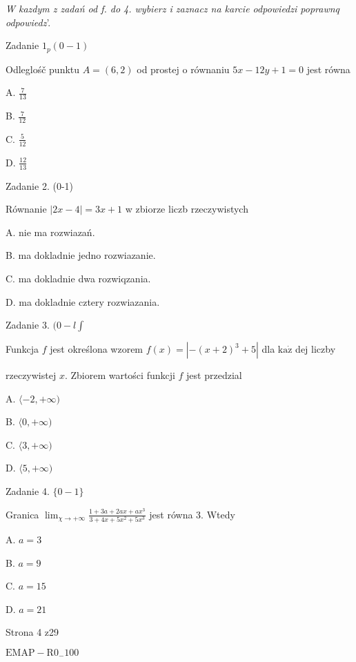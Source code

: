 \documentclass[a4paper,12pt]{article}
\begin{document}
{\it W kazdym z zadań od f. do 4. wybierz i zaznacz na karcie odpowiedzi poprawnq odpowiedz}'.

Zadanie $1_{p}(0-1)$

Odleglośč punktu $A=(6,2)$ od prostej o równaniu $5x-12y+1=0$ jest równa

A. $\displaystyle \frac{7}{13}$

B. $\displaystyle \frac{7}{12}$

C. $\displaystyle \frac{5}{12}$

D. $\displaystyle \frac{12}{13}$

Zadanie 2. (0-1)

Równanie $|2x-4|=3x+1$ w zbiorze liczb rzeczywistych

A. nie ma rozwiazań.

B. ma dokladnie jedno rozwiazanie.

C. ma dokladnie dwa rozwiqzania.

D. ma dokladnie cztery rozwiazania.

Zadanie 3. $(0-l\displaystyle \int$

Funkcja $f$ jest określona wzorem $f(x)=|-(x+2)^{3}+5|$ dla $\mathrm{k}\mathrm{a}\dot{\mathrm{z}}$ dej liczby

rzeczywistej $x$. Zbiorem wartości funkcji $f$ jest przedzial

A. $\langle-2, +\infty)$

B. $\langle 0, +\infty)$

C. $\langle 3, +\infty)$

D. $\langle 5, +\infty)$

Zadanie 4. $\{0-1\}$

Granica $\displaystyle \lim_{\chi\rightarrow+\infty}\frac{1+3a+2ax+ax^{3}}{3+4x+5x^{2}+5x^{3}}$ jest równa 3. Wtedy

A. $a=3$

B. $a=9$

C. $a=15$

D. $a=21$

Strona 4 z29

$\mathrm{E}\mathrm{M}\mathrm{A}\mathrm{P}-\mathrm{R}0_{-}100$
\end{document}
